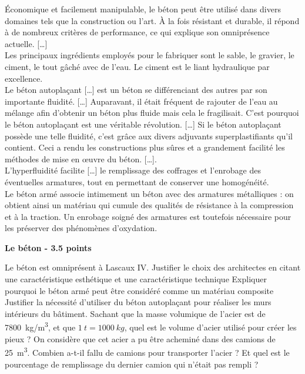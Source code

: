 \documentclass{exam}
\begin{document}
\begin{tcolorbox}[colback=white, colframe=gray, coltitle=black, title=\textbf{Document 2 - Des bétons}]
    Économique et facilement manipulable, le béton peut être utilisé dans divers domaines tels que la construction ou l'art. À la fois résistant et durable, il répond à de nombreux critères de performance, ce qui explique son omniprésence actuelle. […] \\

    Les principaux ingrédients employés pour le fabriquer sont le sable, le gravier, le ciment, le tout gâché avec de l'eau.  
    Le ciment est le liant hydraulique par excellence.  \\

    Le béton autoplaçant […] est un béton se différenciant des autres par son importante fluidité. […] Auparavant, il était fréquent de rajouter de l'eau au mélange afin d'obtenir un béton plus fluide mais cela le fragilisait. C'est pourquoi le béton autoplaçant est une véritable révolution. […] Si le béton autoplaçant possède une telle fluidité, c'est grâce aux divers adjuvants superplastifiants qu'il contient. Ceci a rendu les constructions plus sûres et a grandement facilité les méthodes de mise en œuvre du béton. […]. \\

    L'hyperfluidité facilite […] le remplissage des coffrages et l'enrobage des éventuelles armatures, tout en permettant de conserver une homogénéité. \\

    Le béton armé associe intimement un béton avec des armatures métalliques : on obtient ainsi un matériau qui cumule des qualités de résistance à la compression et à la traction.  
    Un enrobage soigné des armatures est toutefois nécessaire pour les préserver des phénomènes d'oxydation.
\end{tcolorbox}


\vspace{1em}
\textbf{Le béton - 3.5 points}

\begin{questions}
  \question[0.5] Le béton est omniprésent à Lascaux IV. Justifier le choix des architectes en citant une caractéristique esthétique et une caractéristique technique
  \question[0.5] Expliquer pourquoi le béton armé peut être considéré comme un matériau composite
  \question[0.5] Justifier la nécessité d'utiliser du béton autoplaçant pour réaliser les murs intérieurs du bâtiment.
  \question[1] Sachant que la masse volumique de l'acier est de \SI{7800}{kg/m^3}, et que $ \SI{1}{t} = \SI{1000}{kg}$, quel est le volume d'acier utilisé pour créer les pieux ?
  \question[1] On considère que cet acier a pu être acheminé dans des camions de \SI{25}{m^3}. Combien a-t-il fallu de camions pour transporter l'acier ? Et quel est le pourcentage de remplissage du dernier camion qui n'était pas rempli ?
\end{questions}
\end{document}
